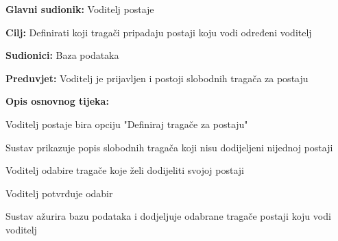 					\noindent {}
					\begin{packed_item}
						
						\item \textbf{Glavni sudionik: }Voditelj postaje
						\item  \textbf{Cilj:} Definirati koji tragači pripadaju postaji koju vodi određeni voditelj 
						\item  \textbf{Sudionici:} Baza podataka
						\item  \textbf{Preduvjet:} Voditelj je prijavljen i postoji slobodnih tragača za postaju
						\item  \textbf{Opis osnovnog tijeka:}
						
						\item[] \begin{packed_enum}
							
							\item Voditelj postaje bira opciju "Definiraj tragače za postaju" 
							\item Sustav prikazuje popis slobodnih tragača koji nisu dodijeljeni nijednoj postaji 
							\item Voditelj odabire tragače koje želi dodijeliti svojoj postaji 
							\item Voditelj potvrđuje odabir 
							\item Sustav ažurira bazu podataka i dodjeljuje odabrane tragače postaji koju vodi voditelj 
						\end{packed_enum}
					\end{packed_item}
					
